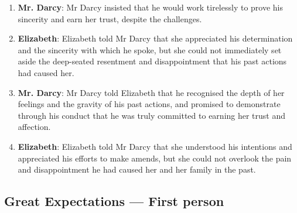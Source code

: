 \documentclass[10pt]{article}
\begin{document}
\begin{enumerate}
\item \textbf{Mr. Darcy}: Mr Darcy insisted that he would work tirelessly to prove his sincerity and earn her trust, despite the challenges.

\item \textbf{Elizabeth}: Elizabeth told Mr Darcy that she appreciated his determination and the sincerity with which he spoke, but she could not immediately set aside the deep-seated resentment and disappointment that his past actions had caused her.

\item \textbf{Mr. Darcy}: Mr Darcy told Elizabeth that he recognised the depth of her feelings and the gravity of his past actions, and promised to demonstrate through his conduct that he was truly committed to earning her trust and affection.

\item \textbf{Elizabeth}: Elizabeth told Mr Darcy that she understood his intentions and appreciated his efforts to make amends, but she could not overlook the pain and disappointment he had caused her and her family in the past.

\end{enumerate}

\subsection*{Great Expectations --- First person}
\end{document}
